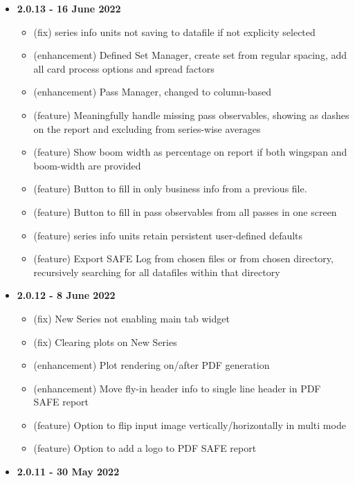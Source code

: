 \documentclass[10pt,letterpaper,titlepage]{article}
\begin{document}
\begin{itemize}
\begin{itemize}
\begin{itemize}
            \end{itemize}
        \end{itemize}
        \item \textbf{2.0.13 - 16 June 2022}
        \begin{itemize}
            \item (fix) series info units not saving to datafile if not explicity selected
            \item (enhancement) Defined Set Manager, create set from regular spacing, add all card process options and spread factors
            \item (enhancement) Pass Manager, changed to column-based
            \item (feature) Meaningfully handle missing pass observables, showing as dashes on the report and excluding from series-wise averages
            \item (feature) Show boom width as percentage on report if both wingspan and boom-width are provided
            \item (feature) Button to fill in only business info from a previous file.
            \item (feature) Button to fill in pass observables from all passes in one screen
            \item (feature) series info units retain persistent user-defined defaults
            \item (feature) Export SAFE Log from chosen files or from chosen directory, recursively searching for all datafiles within that directory
        \end{itemize}
        \item \textbf{2.0.12 - 8 June 2022}
        \begin{itemize}
            \item (fix) New Series not enabling main tab widget
            \item (fix) Clearing plots on New Series
            \item (enhancement) Plot rendering on/after PDF generation 
            \item (enhancement) Move fly-in header info to single line header in PDF SAFE report
            \item (feature) Option to flip input image vertically/horizontally in multi mode
            \item (feature) Option to add a logo to PDF SAFE report
        \end{itemize}
        \item \textbf{2.0.11 - 30 May 2022}

\end{itemize}
\end{document}

